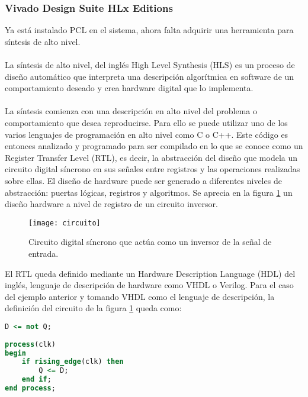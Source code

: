 \subsubsection{Vivado Design Suite HLx Editions}
Ya está instalado PCL en el sistema, ahora falta adquirir una herramienta para síntesis de alto nivel.
\\
\\
La síntesis de alto nivel, del inglés High Level Synthesis (HLS) es un proceso de diseño automático que interpreta una descripción algorítmica en software de un comportamiento deseado y crea hardware digital que lo implementa.
\\
\\
La síntesis comienza con una descripción en alto nivel del problema o comportamiento que desea reproducirse. Para ello se puede utilizar uno de los varios lenguajes de programación en alto nivel como C o C++. Este código es entonces analizado y programado para ser compilado en lo que se conoce como un Register Transfer Level (RTL), es decir, la abstracción del diseño que modela un circuito digital síncrono en sus señales entre registros y las operaciones realizadas sobre ellas.  El diseño de hardware puede ser generado a diferentes niveles de abstracción: puertas lógicas, registros y algoritmos. Se aprecia en la figura \ref{fig:circuito} un diseño hardware a nivel de registro de un circuito inversor.
\begin{figure}[!htb]
\centering
\texttt{[image: circuito]}
  \caption{Circuito digital síncrono que actúa como un inversor de la señal de entrada.}\label{fig:circuito}
\end{figure}

El RTL queda definido mediante un Hardware Description Language (HDL) del inglés, lenguaje de descripción de hardware como VHDL o Verilog. Para el caso del ejemplo anterior y tomando VHDL como el lenguaje de descripción, la definición del circuito de la figura \ref{fig:circuito} queda como:

\begin{lstlisting}[language=VHDL,breaklines]
D <= not Q;
 
process(clk)
begin
    if rising_edge(clk) then
        Q <= D;
    end if;
end process;
\end{lstlisting}


